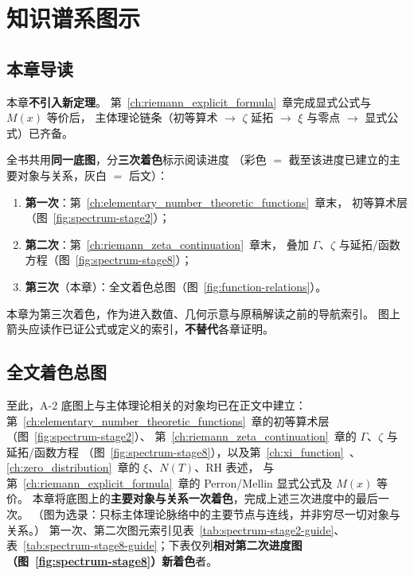 \chapter{知识谱系图示}\label{ch:spectrum_map}
\label{ch:spectrum_diagram}

\section*{本章导读}

本章\textbf{不引入新定理}。
第~\ref{ch:riemann_explicit_formula}~章完成显式公式与 $M(x)$ 等价后，
主体理论链条（初等算术 $\to$ $\zeta$ 延拓 $\to$ $\xi$ 与零点 $\to$ 显式公式）已齐备。

全书共用\textbf{同一底图}，分\textbf{三次着色}标示阅读进度
（彩色 $=$ 截至该进度已建立的主要对象与关系，灰白 $=$ 后文）：
\begin{enumerate}
  \item \textbf{第一次}：第~\ref{ch:elementary_number_theoretic_functions}~章末，
    初等算术层（图~\ref{fig:spectrum-stage2}）；
  \item \textbf{第二次}：第~\ref{ch:riemann_zeta_continuation}~章末，
    叠加 $\Gamma$、$\zeta$ 与延拓/函数方程（图~\ref{fig:spectrum-stage8}）；
  \item \textbf{第三次}（本章）：全文着色总图（图~\ref{fig:function-relations}）。
\end{enumerate}
本章为第三次着色，作为进入数值、几何示意与原稿解读之前的导航索引。
图上箭头应读作已证公式或定义的索引，\textbf{不替代}各章证明。

\section{全文着色总图}
\label{sec:spectrum_full_map}

至此，A-2 底图上与主体理论相关的对象均已在正文中建立：
第~\ref{ch:elementary_number_theoretic_functions}~章的初等算术层
（图~\ref{fig:spectrum-stage2}）、
第~\ref{ch:riemann_zeta_continuation}~章的 $\Gamma$、$\zeta$ 与延拓/函数方程
（图~\ref{fig:spectrum-stage8}），以及第~\ref{ch:xi_function}~、
\ref{ch:zero_distribution}~章的 $\xi$、$N(T)$、RH 表述，
与第~\ref{ch:riemann_explicit_formula}~章的 Perron/Mellin 显式公式及 $M(x)$ 等价。
本章将底图上的\textbf{主要对象与关系一次着色}，完成上述三次进度中的最后一次。
（图为选录：只标主体理论脉络中的主要节点与连线，并非穷尽一切对象与关系。）
第一次、第二次图元索引见表~\ref{tab:spectrum-stage2-guide}、
表~\ref{tab:spectrum-stage8-guide}；下表仅列\textbf{相对第二次进度图（图~\ref{fig:spectrum-stage8}）新着色}者。

